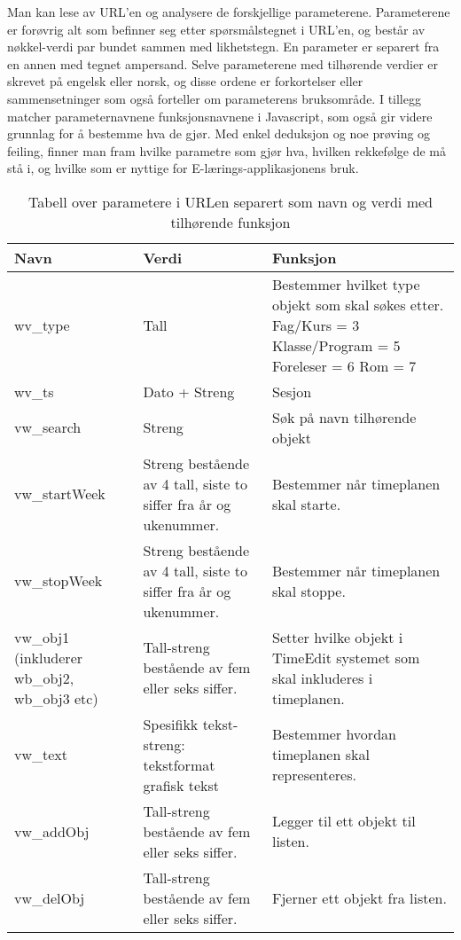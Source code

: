\documentclass[../main.tex]{subfiles}
\begin{document}
Man kan lese av URL’en og analysere de forskjellige parameterene. Parameterene er forøvrig alt som befinner seg etter spørsmålstegnet i URL'en, og består av nøkkel-verdi par bundet sammen med likhetstegn. En parameter er separert fra en annen med tegnet ampersand. Selve parameterene med tilhørende verdier er skrevet på engelsk eller norsk, og disse ordene er forkortelser eller sammensetninger som også forteller om parameterens bruksområde.  I tillegg matcher parameternavnene funksjonsnavnene i Javascript, som også gir videre grunnlag for å bestemme hva de gjør. Med enkel deduksjon og noe prøving og feiling, finner man fram hvilke parametre som gjør hva, hvilken rekkefølge de må stå i, og hvilke som er nyttige for E-lærings-applikasjonens bruk.

\begin{table}[H]
\begin{center}
\caption{Tabell over parametere i URLen separert som navn og verdi med tilhørende funksjon}
  \begin{tabular}{ | p{3cm} | p{6cm} | p{6cm} |}
    \hline
    Navn & Verdi & Funksjon \\ \hline
    wv\_type & Tall & Bestemmer hvilket type objekt som skal søkes etter. \newline Fag/Kurs = 3 \newline Klasse/Program = 5 \newline Foreleser = 6 \newline Rom = 7 \\ \hline
    wv\_ts & Dato + Streng & Sesjon \\ \hline
    vw\_search & Streng & Søk på navn tilhørende objekt \\ \hline
    vw\_startWeek & Streng bestående av 4 tall, siste to siffer fra år og ukenummer. & Bestemmer når timeplanen skal starte. \\ \hline
    vw\_stopWeek & Streng bestående av 4 tall, siste to siffer fra år og ukenummer. & Bestemmer når timeplanen skal stoppe. \\ \hline
    vw\_obj1 \newline (inkluderer wb\_obj2, \newline wb\_obj3 etc) & Tall-streng bestående av fem eller seks siffer. & Setter hvilke objekt i TimeEdit systemet som skal inkluderes i timeplanen. \\ \hline
    vw\_text & Spesifikk tekst-streng: \newline tekstformat \newline grafisk \newline tekst & Bestemmer hvordan timeplanen skal representeres. \\ \hline
    vw\_addObj & Tall-streng bestående av fem eller seks siffer. & Legger til ett objekt til listen. \\ \hline
    vw\_delObj & Tall-streng bestående av fem eller seks siffer. & Fjerner ett objekt fra listen. \\
    \hline
  \end{tabular}
\end{center}
\end{table}
\end{document}
